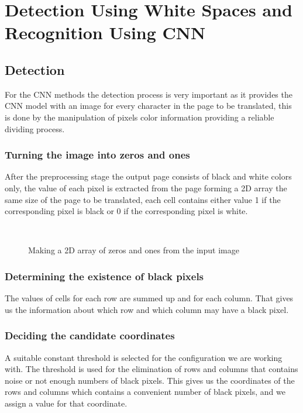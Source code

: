 \section{Detection Using White Spaces and Recognition Using CNN}

\setcounter{figure}{0}
\renewcommand{\thefigure}{6.\arabic{figure}}

\subsection{Detection}
For the CNN methods the detection process is very important as it provides the CNN model with an image for every character in the page to be translated, this is done by the manipulation of pixels color information providing a reliable dividing process. 
\subsubsection{Turning the image into zeros and ones}
After the preprocessing stage the output page consists of black and white colors only, the value of each pixel is extracted from the page forming a 2D array the same size of the page to be translated, each cell contains either value 1 if the corresponding pixel is black or 0 if the corresponding pixel is white.
\begin{figure}[!ht]
    \centering
    \hfill
    \\
    \caption{Making a 2D array of zeros and ones from the input image}
    \label{fig:Making a 2D array of zeros and ones from the input image}
\end{figure}

\subsubsection{Determining the existence of black pixels}
The values of cells for each row are summed up and for each column. That gives us the information about which row and which column may have a black pixel.
\subsubsection{Deciding the candidate coordinates}
A suitable constant threshold is selected for the configuration we are working with. The threshold is used for the elimination of rows and columns that contains noise or not enough numbers of black pixels. This gives us the coordinates of the rows and columns which contains a convenient  number of black pixels, and we assign a value for that coordinate.

